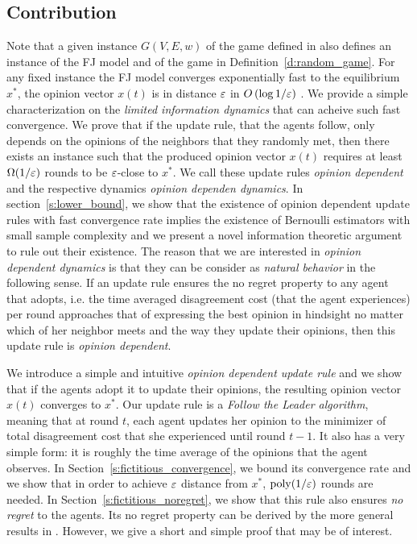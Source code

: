 \subsection{Contribution} Note that a given instance $G(V,E,w)$ of the game
defined in \cite{BKO11} also defines an instance of the FJ model and of the
game in Definition~\ref{d:random_game}. For any fixed instance the FJ model
converges exponentially fast to the equilibrium $x^*$, the opinion vector
$x(t)$ is in distance $\varepsilon$ in $O\left(\log 1/\varepsilon\right)$ \cite{GS14}.  We provide
a simple characterization on the \emph{limited information dynamics} that can
acheive such fast convergence. We prove that if the update rule, that the
agents follow, only depends on the opinions of the neighbors that they randomly
met, then there exists an instance such that the produced opinion vector $x(t)$
requires at least $\Omega(1/\varepsilon)$ rounds to be $\varepsilon$-close to $x^*$. We call
these update rules \emph{opinion dependent} and the respective dynamics
\emph{opinion dependen dynamics}. In section~\ref{s:lower_bound}, we show that
the existence of opinion dependent update rules with fast convergence rate
implies the existence of Bernoulli estimators with small sample complexity and
we present a novel information theoretic argument to rule out their existence.
The reason that we are interested in \emph{opinion dependent dynamics} is that
they can be consider as \emph{natural behavior} in the following sense. If an
update rule ensures the no regret property to any agent that adopts, i.e. the
time averaged disagreement cost (that the agent experiences) per round
approaches that of expressing the best opinion in hindsight no matter which of
her neighbor meets and the way they update their opinions, then this update
rule is \emph{opinion dependent}.

We introduce a simple and intuitive \emph{opinion dependent update rule} and we
show that if the agents adopt it to update their opinions, the resulting
opinion vector $x(t)$ converges to $x^*$.  Our update rule is a \emph{Follow
  the Leader algorithm}, meaning that at round $t$, each agent updates her
opinion to the minimizer of total disagreement cost that she experienced until
round $t-1$.  It also has a very simple form: it is roughly the time average of
the opinions that the agent observes.  In
Section~\ref{s:fictitious_convergence}, we bound its convergence rate and we
show that in order to achieve $\varepsilon$ distance from $x^*$, $\mathrm{poly}(1/\varepsilon)$
rounds are needed. In Section~\ref{s:fictitious_noregret}, we show that this
rule also ensures \emph{no regret} to the agents.  Its no regret property can
be derived by the more general results in \cite{HAK07}.  However, we give a
short and simple proof that may be of interest.

